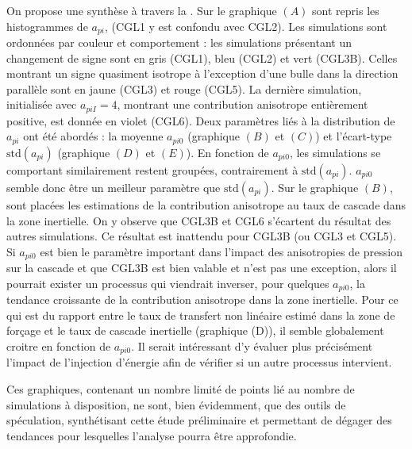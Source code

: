  On propose une synthèse à travers la . Sur le graphique $(A)$ sont repris les histogrammes de $a_{pi}$, (CGL1 y est confondu avec CGL2). Les simulations sont ordonnées par couleur et comportement : les simulations présentant un changement de signe sont en gris (CGL1), bleu (CGL2) et vert (CGL3B). Celles  montrant un signe quasiment isotrope à l'exception d'une \og bulle \fg{} dans la direction parallèle sont en jaune (CGL3) et rouge (CGL5). La dernière simulation, initialisée avec $a_{piI}  = 4$, montrant une contribution anisotrope entièrement positive, est donnée en violet (CGL6). Deux paramètres liés à la distribution de $a_{pi}$ ont été abordés : la moyenne $a_{pi0}$ (graphique $(B)$ et $(C)$) et l'écart-type $\text{std}(a_{pi})$ (graphique $(D)$ et $(E)$). En fonction de $a_{pi0}$, les simulations se comportant similairement restent groupées, contrairement à $\text{std}(a_{pi})$. $a_{pi0}$ semble donc être un meilleur paramètre que $\text{std}(a_{pi})$. Sur le graphique $(B)$, sont placées les estimations de la contribution anisotrope au taux de cascade dans la zone inertielle. On y observe que CGL3B et CGL6 s'écartent du résultat des autres simulations. Ce résultat est inattendu pour CGL3B (ou CGL3 et CGL5). Si $a_{pi0}$ est bien le paramètre important dans l'impact des anisotropies de pression sur la cascade et que CGL3B est bien valable et n'est pas une exception, alors il pourrait exister un processus qui viendrait inverser, pour quelques $a_{pi0}$, la tendance croissante de la contribution anisotrope dans la zone inertielle. Pour ce qui est du rapport entre le taux de transfert non linéaire estimé dans la zone de forçage et le taux de cascade inertielle (graphique (D)), il semble globalement croitre en fonction de $a_{pi0}$. Il serait intéressant d'y évaluer plus précisément l'impact de l'injection d'énergie afin de vérifier si un autre processus intervient. 
 
 Ces graphiques, contenant un nombre limité de points lié au nombre de simulations à disposition, ne sont, bien évidemment, que des outils de spéculation, synthétisant cette étude préliminaire et permettant de dégager des tendances pour lesquelles l'analyse pourra être approfondie.





